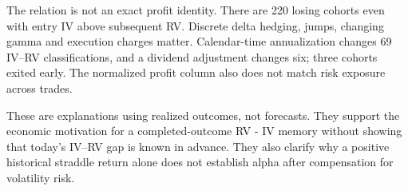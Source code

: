 The relation is not an exact profit identity. There are 220 losing cohorts even with entry IV above subsequent RV. Discrete delta hedging, jumps, changing gamma and execution charges matter. Calendar-time annualization changes 69 IV--RV classifications, and a dividend adjustment changes six; three cohorts exited early. The normalized profit column also does not match risk exposure across trades.


These are explanations using realized outcomes, not forecasts. They support the economic motivation for a completed-outcome RV - IV memory without showing that today's IV--RV gap is known in advance. They also clarify why a positive historical straddle return alone does not establish alpha after compensation for volatility risk.
